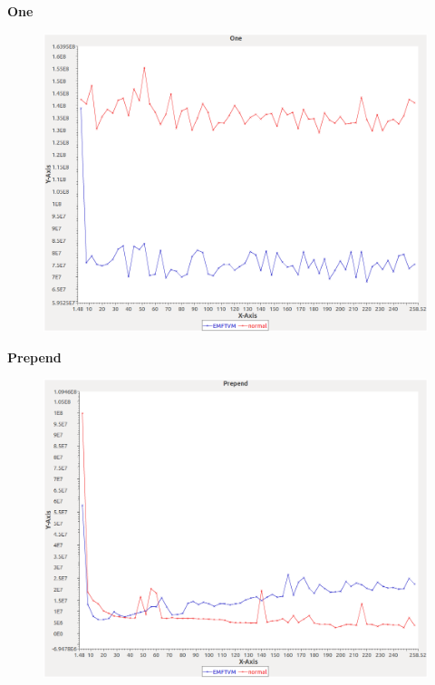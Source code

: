 \noindent\textbf{One}

\begin{figure}[h]
\centering
\includegraphics[width=\textwidth]{../graphs/sequence/One}
\end{figure}
\pagebreak

\noindent\textbf{Prepend}

\begin{figure}[h]
\centering
\includegraphics[width=\textwidth]{../graphs/sequence/Prepend}
\end{figure}
\pagebreak

